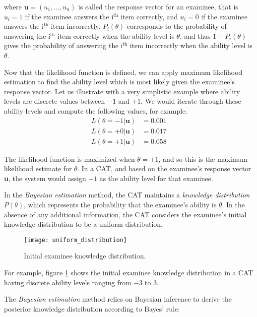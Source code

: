 where $\textbf{u}=(u_1, ..., u_n)$ is called the response vector for an examinee, that is $u_i=1$ if the examinee answers the i$^\text{th}$ item correctly, and $u_i=0$ if the examinee answers the i$^\text{th}$ item incorrectly. $P_i(\theta)$ corresponds to the probability of answering the i$^\text{th}$ item correctly when the ability level is $\theta$, and thus $1 - P_i(\theta)$ gives the probability of answering the i$^\text{th}$ item incorrectly when the ability level is $\theta$. \newline

Now that the likelihood function is defined, we can apply maximum likelihood estimation to find the ability level which is most likely given the examinee's response vector. Let us illustrate with a very simplistic example where ability levels are discrete values between $-1$ and $+1$. We would iterate through these ability levels and compute the following values, for example:
\begin{align*}
L(\theta=-1 | \textbf{u}) &= 0.001 \\
L(\theta=+0 | \textbf{u}) &= 0.017 \\
L(\theta=+1 | \textbf{u}) &= 0.058
\end{align*}

The likelihood function is maximized when $\theta = +1$, and so this is the maximum likelihood estimate for $\theta$. In a CAT, and based on the examinee's response vector \textbf{u}, the system would assign $+1$ as the ability level for that examinee.\newline

In the \textit{Bayesian estimation} method, the CAT maintains a \textit{knowledge distribution} $P(\theta)$, which represents the probability that the examinee's ability is $\theta$. In the absence of any additional information, the CAT considers the examinee's initial knowledge distribution to be a uniform distribution.

\begin{figure}[H]
\centering
\texttt{[image: uniform\_distribution]}
\caption{Initial examinee knowledge distribution.}
\label{fig:uniform_distribution}
\end{figure}

For example, figure \ref{fig:uniform_distribution} shows the initial examinee knowledge distribution in a CAT having discrete ability levels ranging from $-3$ to $3$.\newline

The \textit{Bayesian estimation} method relies on Bayesian inference to derive the posterior knowledge distribution according to Bayes' rule:

